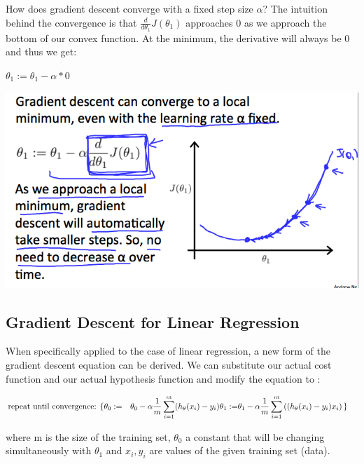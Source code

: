 \documentclass[
]{article}
\begin{document}
How does gradient descent converge with a fixed step size \(\alpha\)?
The intuition behind the convergence is that
\(\frac{d}{d\theta_1} J(\theta_1)\) approaches 0 as we approach the
bottom of our convex function. At the minimum, the derivative will
always be 0 and thus we get:

\(\theta_1:=\theta_1-\alpha * 0\)

\includegraphics{Gradien_Descent_Intution_graph_3.png}

\hypertarget{gradient-descent-for-linear-regression}{%
\subsection{Gradient Descent for Linear
Regression}\label{gradient-descent-for-linear-regression}}

When specifically applied to the case of linear regression, a new form
of the gradient descent equation can be derived. We can substitute our
actual cost function and our actual hypothesis function and modify the
equation to :

\(\begin{align*} \text{repeat until convergence: } \lbrace & \newline \theta_0 := & \theta_0 - \alpha \frac{1}{m} \sum\limits_{i=1}^{m}(h_\theta(x_{i}) - y_{i}) \newline \theta_1 := & \theta_1 - \alpha \frac{1}{m} \sum\limits_{i=1}^{m}\left((h_\theta(x_{i}) - y_{i}) x_{i}\right) \newline \rbrace& \end{align*}\)

where m is the size of the training set, \(\theta_0\) a constant that
will be changing simultaneously with \(\theta_1\) and \(x_{i}, y_{i}\)
are values of the given training set (data).
\end{document}
